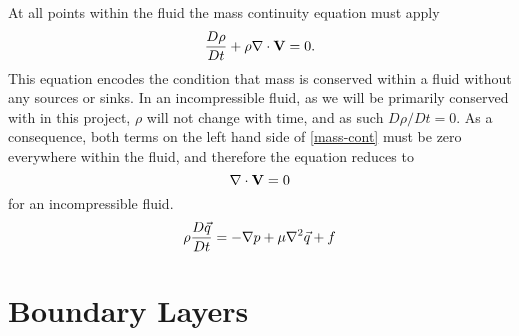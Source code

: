 At all points within the fluid the mass continuity equation must apply
\begin{equation} \label{mass-cont}
\frac{D\rho}{Dt} + \rho \nabla \cdot \mathbf{V} = 0 .
\end{equation}
This equation encodes the condition that mass is conserved within a fluid without any sources or sinks.
In an incompressible fluid, as we will be primarily conserved with in this project, $\rho$ will not
change with time, and as such $D \rho / D t = 0$. As a consequence, both terms on the left hand side of
\eqref{mass-cont} must be zero everywhere within the fluid, and therefore the equation reduces to
\begin{equation} \label{incompress}
\nabla \cdot \mathbf{V} = 0
\end{equation}
for an incompressible fluid. 
\begin{equation}
\rho \frac{D\vec{q}}{Dt} = - \nabla p + \mu \nabla^2 \vec{q} + f
\end{equation}

\section{Boundary Layers}

